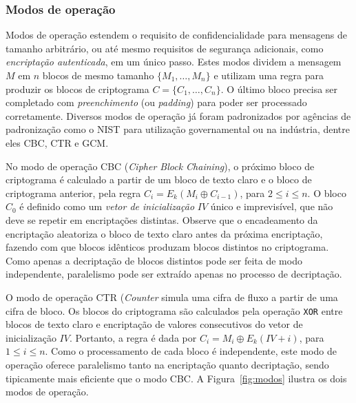 \documentclass{SBCbookchapter}
\begin{document}
\subsubsection*{Modos de operação}

Modos de operação estendem o requisito de confidencialidade para mensagens de tamanho arbitrário, ou até mesmo requisitos de segurança adicionais, como \emph{encriptação autenticada}, em um único passo. Estes modos dividem a mensagem $M$ em $n$ blocos de mesmo tamanho $\{M_1, \ldots, M_n\}$ e utilizam uma regra para produzir os blocos de criptograma $C = \{C_1, \ldots, C_n\}$.
O último bloco precisa ser completado com \emph{preenchimento} (ou \emph{padding}) para poder ser processado corretamente.
Diversos modos de operação já foram padronizados por agências de padronização como o NIST para utilização governamental ou na indústria, dentre eles CBC, CTR e GCM.

No modo de operação CBC (\emph{Cipher Block Chaining}), o próximo bloco de criptograma é calculado a partir de um bloco de texto claro e o bloco de criptograma anterior, pela regra $C_i = E_k(M_i \oplus C_{i-1})$, para $2 \leq i \leq n$. O bloco $C_0$ é definido como um \emph{vetor de inicialização} $IV$ único e imprevisível, que não deve se repetir em encriptações distintas. Observe que o encadeamento da encriptação aleatoriza o bloco de texto claro antes da próxima encriptação, fazendo com que blocos idênticos produzam blocos distintos no criptograma. Como apenas a decriptação de blocos distintos pode ser feita de modo independente, paralelismo pode ser extraído apenas no processo de decriptação.

O modo de operação CTR (\emph{Counter} simula uma cifra de fluxo a partir de uma cifra de bloco. Os blocos do criptograma são calculados pela operação \texttt{XOR} entre blocos de texto claro e encriptação de valores consecutivos do vetor de inicialização $IV$. Portanto, a regra é dada por $C_i = M_i \oplus E_k(IV + i)$, para $1 \leq i \leq n$. Como o processamento de cada bloco é independente, este modo de operação oferece paralelismo tanto na encriptação quanto decriptação, sendo tipicamente mais eficiente que o modo CBC. A Figura~\ref{fig:modos} ilustra os dois modos de operação.
\end{document}
